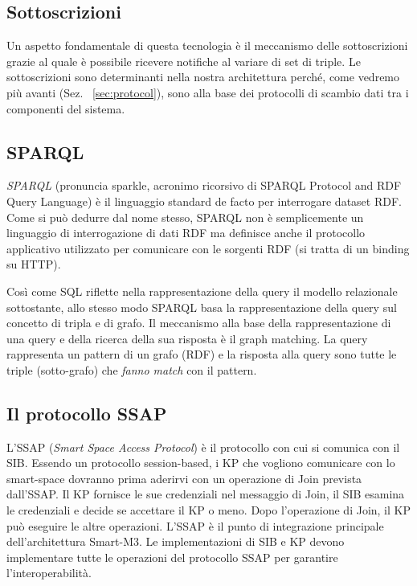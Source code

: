\subsection{Sottoscrizioni}

Un aspetto fondamentale di questa tecnologia è il meccanismo delle sottoscrizioni grazie al quale è possibile ricevere notifiche al variare di set di triple. Le sottoscrizioni sono determinanti nella nostra architettura perché, come vedremo più avanti (Sez. ~\ref{sec:protocol}), sono alla base dei protocolli di scambio dati tra i componenti del sistema.

\subsection{SPARQL}

\emph{SPARQL}  (pronuncia sparkle, acronimo ricorsivo di SPARQL Protocol and RDF Query Language) è il linguaggio standard de facto per interrogare dataset RDF. Come si può dedurre dal nome stesso, SPARQL non è semplicemente un linguaggio di interrogazione di dati RDF ma definisce anche il protocollo applicativo utilizzato per comunicare con le sorgenti RDF (si tratta di un binding su HTTP).

Così come SQL riflette nella rappresentazione della query il modello relazionale sottostante, allo stesso modo SPARQL basa la rappresentazione della query sul concetto di tripla e di grafo. Il meccanismo alla base della rappresentazione di una query e della ricerca della sua risposta è il graph matching. La query rappresenta un pattern di un grafo (RDF) e la risposta alla query sono tutte le triple (sotto-grafo) che \emph{fanno match} con il pattern.

\subsection{Il protocollo SSAP}

L'SSAP (\emph{Smart Space Access Protocol}) è il protocollo con cui si comunica con il SIB. Essendo un protocollo session-based, i KP che vogliono comunicare con lo smart-space dovranno prima aderirvi con un operazione di Join prevista dall'SSAP. Il KP fornisce le sue credenziali nel messaggio di Join, il SIB esamina le credenziali e decide se accettare il KP o meno. Dopo l'operazione di Join, il KP può eseguire le altre operazioni. 
L'SSAP è il punto di integrazione principale dell'architettura Smart-M3. Le implementazioni di SIB e KP devono implementare tutte le operazioni del protocollo SSAP per garantire l'interoperabilità.

